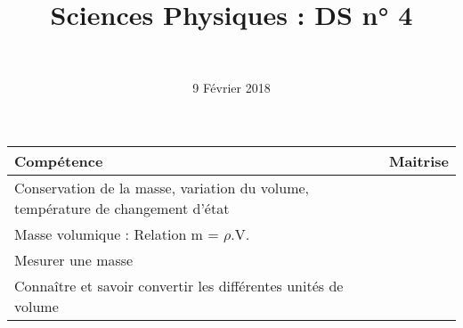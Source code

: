 \documentclass[a4paper,11pt]{exam}
\author{\ }
\date{9 Février 2018}
\title{Sciences Physiques : DS n° 4}
\begin{document}
%	


	\maketitle


\begin{small}
	\begin{center}
		\begin{tabular}{|@{\ }l@{}|@{\ }c@{\ }|}
			\hline
			\textbf{Compétence} & \textbf{Maitrise} \\
			\hline
			Conservation de la masse, variation du volume, température de changement d’état \ \ &  \ \ \ \\
			\hline
			Masse volumique : Relation m = $\rho$.V. &  \\
			\hline			
			Mesurer une masse &  \\
			\hline
			Connaître et savoir convertir les différentes unités de volume &  \\
			\hline
		\end{tabular}
	\end{center}
\end{small}	
\vspace*{-0.5cm}	



\newpage 





\newpage



%







\label{LastPage}
\end{document}
